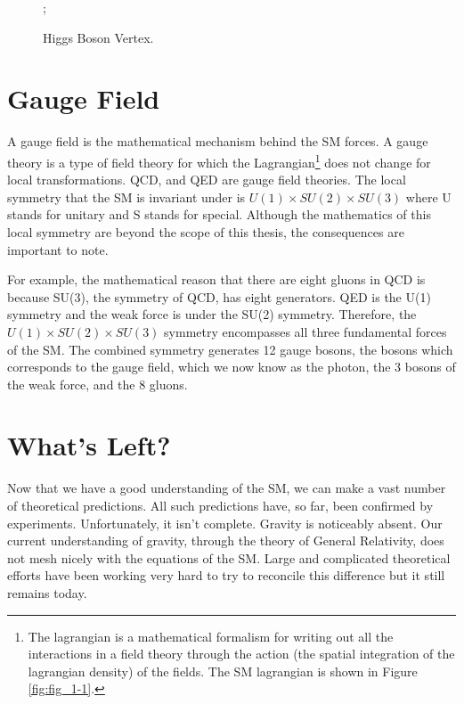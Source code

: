 \begin{figure} %
   \centering
      ;
   \caption{Higgs Boson Vertex.}
   \label{fig:fig_1-9}
\end{figure}
\clearpage
\section{Gauge Field}

A gauge field is the mathematical mechanism behind the SM forces. A gauge theory is a type of field theory for which the Lagrangian\footnote{The lagrangian is a mathematical formalism for writing out all the interactions in a field theory through the action (the spatial integration of the lagrangian density) of the fields. The SM lagrangian is shown in Figure \ref{fig:fig_1-1}.} does not change for local transformations. 
QCD, and QED are gauge field theories. The local symmetry that the SM is invariant under is $U(1)\times SU(2)\times SU(3)$ where U stands for unitary and S stands for special.
Although the mathematics of this local symmetry are beyond the scope of this thesis, the consequences are important to note.

For example, the mathematical reason that there are eight gluons in QCD is because SU(3), the symmetry of QCD, has eight generators. QED is the U(1) symmetry and the weak force is under the SU(2) symmetry.
Therefore, the $U(1)\times SU(2)\times SU(3)$ symmetry encompasses all three fundamental forces of the SM. 
The combined symmetry generates 12 gauge bosons, the bosons which corresponds to the gauge field, which we now know as the photon, the 3 bosons of the weak force, and the 8 gluons.

\section{What's Left?}

Now that we have a good understanding of the SM, we can make a vast number of theoretical predictions.  All such predictions have, so far, been confirmed by experiments. 
Unfortunately, it isn't complete. 
Gravity is noticeably absent. Our current understanding of gravity, through the theory of General Relativity, does not mesh nicely with the equations of the SM. Large and complicated theoretical efforts have been working very hard to try to reconcile this difference but it still remains today. 

